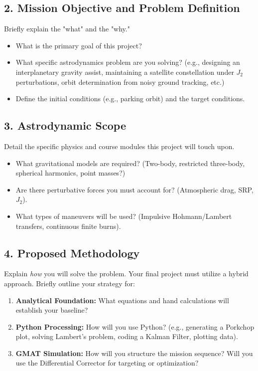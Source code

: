 \documentclass[11pt, letterpaper]{article}
\begin{document}
\subsection*{2. Mission Objective and Problem Definition}
Briefly explain the "what" and the "why." 
\begin{itemize}
    \item What is the primary goal of this project? 
    \item What specific astrodynamics problem are you solving? (e.g., designing an interplanetary gravity assist, maintaining a satellite constellation under $J_2$ perturbations, orbit determination from noisy ground tracking, etc.)
    \item Define the initial conditions (e.g., parking orbit) and the target conditions.
\end{itemize}

\subsection*{3. Astrodynamic Scope}
Detail the specific physics and course modules this project will touch upon. 
\begin{itemize}
    \item What gravitational models are required? (Two-body, restricted three-body, spherical harmonics, point masses?)
    \item Are there perturbative forces you must account for? (Atmospheric drag, SRP, $J_2$).
    \item What types of maneuvers will be used? (Impulsive Hohmann/Lambert transfers, continuous finite burns).
\end{itemize}

\subsection*{4. Proposed Methodology}
Explain \textit{how} you will solve the problem. Your final project must utilize a hybrid approach. Briefly outline your strategy for:
\begin{enumerate}
    \item \textbf{Analytical Foundation:} What equations and hand calculations will establish your baseline?
    \item \textbf{Python Processing:} How will you use Python? (e.g., generating a Porkchop plot, solving Lambert's problem, coding a Kalman Filter, plotting data).
    \item \textbf{GMAT Simulation:} How will you structure the mission sequence? Will you use the Differential Corrector for targeting or optimization?
\end{enumerate}
\end{document}
